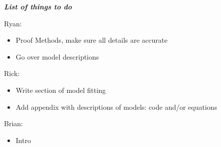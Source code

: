 \textit{\textbf{List of things to do}}

Ryan:
\begin{itemize}
\item Proof Methods, make sure all details are accurate
\item Go over model descriptions
\end{itemize}
Rick:
\begin{itemize}
\item Write section of model fitting
\item Add appendix with descriptions of models: code and/or equations
\end{itemize}

Brian:
\begin{itemize}
\item Intro
\end{itemize}
